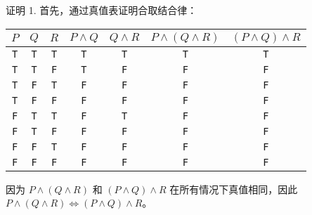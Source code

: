 \begin{proofs}{证明 1. }
    首先，通过真值表证明合取结合律：
    \begin{center}
        \begin{tabular}{c|c|c|c|c|c|c}
              $P$    & $Q$   & $R$ & $P \land Q$ &  $Q \land R$  & $P \land (Q \land R)$ & $(P \land Q) \land R$ \\
              \hline
              \verb|T| & \verb|T| & \verb|T| &  \verb|T|  &    \verb|T|    &\verb|T| &    \verb|T|    \\
              \verb|T| & \verb|T| & \verb|F| &  \verb|T|  &    \verb|F|    &\verb|F| &    \verb|F|    \\
              \verb|T| & \verb|F| & \verb|T| &  \verb|F|  &    \verb|F|    &\verb|F| &    \verb|F|    \\
              \verb|T| & \verb|F| & \verb|F| &  \verb|F|  &    \verb|F|    &\verb|F| &    \verb|F|    \\
              \verb|F| & \verb|T| & \verb|T| &  \verb|F|  &    \verb|T|    &\verb|F| &    \verb|F|    \\
              \verb|F| & \verb|T| & \verb|F| &  \verb|F|  &    \verb|F|    &\verb|F| &    \verb|F|    \\
              \verb|F| & \verb|F| & \verb|T| &  \verb|F|  &    \verb|F|    &\verb|F| &    \verb|F|    \\
              \verb|F| & \verb|F| & \verb|F| &  \verb|F|  &    \verb|F|    &\verb|F| &    \verb|F|    \\
        \end{tabular}
    \end{center}

    因为 $P \land (Q \land R)$ 和 $(P \land Q) \land R$ 在所有情况下真值相同，因此 $P \land (Q \land R) \iff (P \land Q) \land R$。\\


\end{proofs}
